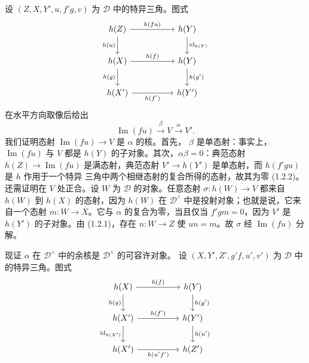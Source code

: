 \clearpage
{}%
\begingroup\small\setlength{\parskip}{0pt}\setlength{\emergencystretch}{1.5em}
设 $(Z,X,Y',u,f'g,v)$ 为 $\mathcal D$ 中的特异三角。图式
\[
\begin{tikzcd}[column sep=5em,row sep=2.1em]
h(Z)\arrow[r,"h(fu)"]\arrow[d,"h(u)"']&h(Y)\arrow[d,"\operatorname{id}_{h(Y)}"]\\
h(X)\arrow[r,"h(f)"]\arrow[d,"h(g)"']&h(Y)\arrow[d,"h(g')"]\\
h(X')\arrow[r,"h(f')"']&h(Y')
\end{tikzcd}
\]
在水平方向取像后给出
\[
\operatorname{Im}(fu)\xrightarrow{\beta}V\xrightarrow{\alpha}V'.
\tag{3.2.5.1}
\]
我们证明态射 $\operatorname{Im}(fu)\to V$ 是 $\alpha$ 的核。首先，
$\beta$ 是单态射：事实上，$\operatorname{Im}(fu)$ 与 $V$ 都是
$h(Y)$ 的子对象。其次，$\alpha\beta=0$：典范态射
$h(Z)\to\operatorname{Im}(fu)$ 是满态射，典范态射
$V'\to h(Y')$ 是单态射，而 $h(f'gu)$ 是 $h$ 作用于一个特异
三角中两个相继态射的复合所得的态射，故其为零 (1.2.2)。
还需证明在 $V$ 处正合。设 $W$ 为 $\mathcal D$ 的对象。任意态射
$\sigma\colon h(W)\to V$ 都来自 $h(W)$ 到 $h(X)$ 的态射，因为
$h(W)$ 在 $\mathcal D^\wedge$ 中是投射对象；也就是说，它来自一个态射
$m\colon W\to X$。它与 $\alpha$ 的复合为零，当且仅当
$f'gm=0$，因为 $V'$ 是 $h(Y')$ 的子对象。由 (1.2.1)，存在
$n\colon W\to Z$ 使 $un=m$。故 $\sigma$ 经 $\operatorname{Im}(fu)$ 分解。

现证 $\alpha$ 在 $\mathcal D^\wedge$ 中的余核是 $\mathcal D^\wedge$ 的可容许对象。
设 $(X,Y',Z',g'f,u',v')$ 为 $\mathcal D$ 中的特异三角。图式
\[
\begin{tikzcd}[column sep=5em,row sep=2em]
h(X)\arrow[r,"h(f)"]\arrow[d,"h(g)"']&h(Y)\arrow[d,"h(g')"]\\
h(X')\arrow[r,"h(f')"]\arrow[d,"\operatorname{id}_{h(X')}"']&h(Y')\arrow[d,"h(u')"]\\
h(X')\arrow[r,"h(u'f')"']&h(Z')
\end{tikzcd}
\]
\endgroup
